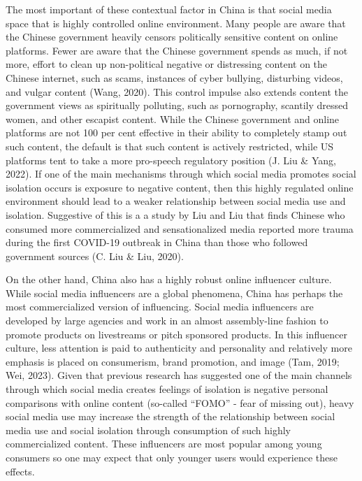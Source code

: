 \documentclass[]{interact}
\theoremstyle{plain}%
\theoremstyle{definition}
\theoremstyle{remark}
\begin{document}
The most important of these contextual factor in China is that social
media space that is highly controlled online environment. Many people
are aware that the Chinese government heavily censors politically
sensitive content on online platforms. Fewer are aware that the Chinese
government spends as much, if not more, effort to clean up non-political
negative or distressing content on the Chinese internet, such as scams,
instances of cyber bullying, disturbing videos, and vulgar content
(Wang, 2020). This control impulse also extends content the government
views as spiritually polluting, such as pornography, scantily dressed
women, and other escapist content. While the Chinese government and
online platforms are not 100 per cent effective in their ability to
completely stamp out such content, the default is that such content is
actively restricted, while US platforms tent to take a more pro-speech
regulatory position (J. Liu \& Yang, 2022). If one of the main
mechanisms through which social media promotes social isolation occurs
is exposure to negative content, then this highly regulated online
environment should lead to a weaker relationship between social media
use and isolation. Suggestive of this is a a study by Liu and Liu that
finds Chinese who consumed more commercialized and sensationalized media
reported more trauma during the first COVID-19 outbreak in China than
those who followed government sources (C. Liu \& Liu, 2020).

On the other hand, China also has a highly robust online influencer
culture. While social media influencers are a global phenomena, China
has perhaps the most commercialized version of influencing. Social media
influencers are developed by large agencies and work in an almost
assembly-line fashion to promote products on livestreams or pitch
sponsored products. In this influencer culture, less attention is paid
to authenticity and personality and relatively more emphasis is placed
on consumerism, brand promotion, and image (Tam, 2019; Wei, 2023). Given
that previous research has suggested one of the main channels through
which social media creates feelings of isolation is negative personal
comparisons with online content (so-called ``FOMO'' - fear of missing
out), heavy social media use may increase the strength of the
relationship between social media use and social isolation through
consumption of such highly commercialized content. These influencers are
most popular among young consumers so one may expect that only younger
users would experience these effects.
\end{document}
